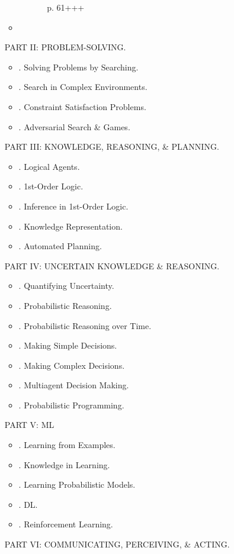 \documentclass{article}
\begin{document}
\begin{itemize}
\begin{itemize}
\begin{itemize}
\begin{itemize}
				p. 61+++
			\end{itemize}
		\end{itemize}
		\item
	\end{itemize}
	PART II: PROBLEM-SOLVING.
	\begin{itemize}
		\item {. Solving Problems by Searching.}
		\item {. Search in Complex Environments.}
		\item {. Constraint Satisfaction Problems.}
		\item {. Adversarial Search \& Games.}
	\end{itemize}
	PART III: KNOWLEDGE, REASONING, \& PLANNING.
	\begin{itemize}
		\item {. Logical Agents.}
		\item {. 1st-Order Logic.}
		\item {. Inference in 1st-Order Logic.}
		\item {. Knowledge Representation.}
		\item {. Automated Planning.}
	\end{itemize}
	PART IV: UNCERTAIN KNOWLEDGE \& REASONING.
	\begin{itemize}
		\item {. Quantifying Uncertainty.}
		\item {. Probabilistic Reasoning.}
		\item {. Probabilistic Reasoning over Time.}
		\item {. Making Simple Decisions.}
		\item {. Making Complex Decisions.}
		\item {. Multiagent Decision Making.}
		\item {. Probabilistic Programming.}
	\end{itemize}
	PART V: ML
	\begin{itemize}
		\item {. Learning from Examples.}
		\item {. Knowledge in Learning.}
		\item {. Learning Probabilistic Models.}
		\item {. DL.}
		\item {. Reinforcement Learning.}
	\end{itemize}
	PART VI: COMMUNICATING, PERCEIVING, \& ACTING.
	\begin{itemize}

\end{itemize}
\end{itemize}
\end{document}
